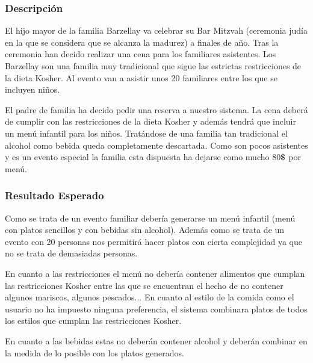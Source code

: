 \documentclass{article}
\newcommand{\dollar}{\mbox{\textdollar}}
\begin{document}
\subsubsection{Descripción}
El hijo mayor de la familia Barzellay va celebrar su Bar Mitzvah (ceremonia judía en la que se considera que se alcanza la madurez) a finales de año. Tras la ceremonia han decido realizar una cena para los familiares asistentes. Los Barzellay son una familia muy tradicional que sigue las estrictas restricciones de la dieta Kosher. Al evento van a asistir unos 20 familiares entre los que se incluyen niños.
\par
El padre de familia ha decido pedir una reserva a nuestro sistema. La cena deberá de cumplir con las restricciones de la dieta Kosher y además tendrá que incluir un menú infantil para los niños. Tratándose de una familia tan tradicional el alcohol como bebida queda completamente descartada. Como son pocos asistentes y es un evento especial la familia esta dispuesta ha dejarse como mucho 80$\dollar$ por menú.

\subsubsection{Resultado Esperado}
Como se trata de un evento familiar debería generarse un menú infantil (menú con platos sencillos y con bebidas sin alcohol). Además como se trata de un evento con 20 personas nos permitirá hacer platos con cierta complejidad ya que no se trata de demasiadas personas.
\par
En cuanto a las restricciones el menú no debería contener alimentos que cumplan las restricciones Kosher entre las que se encuentran el hecho de no contener algunos mariscos, algunos pescados... En cuanto al estilo de la comida como el usuario no ha impuesto ninguna preferencia, el sistema combinara platos de todos los estilos que cumplan las restricciones Kosher.
\par
En cuanto a las bebidas estas no deberán contener alcohol y deberán combinar en la medida de lo posible con los platos generados.
\end{document}
